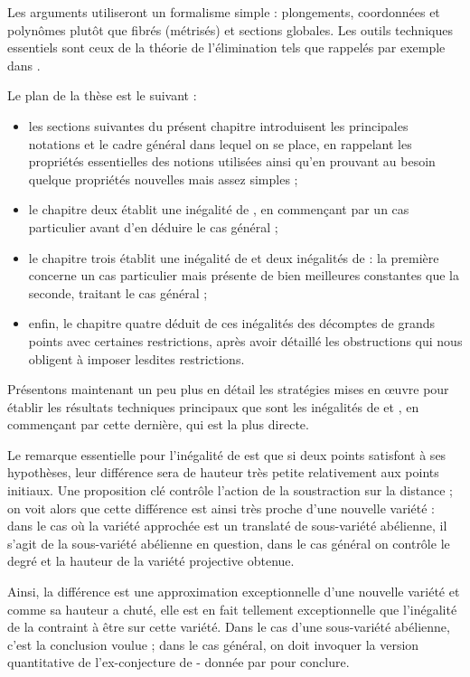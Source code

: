 Les arguments utiliseront un formalisme simple : plongements, coordonnées et
polynômes plutôt que fibrés (métrisés) et sections globales. Les outils
techniques essentiels sont ceux de la théorie de l'élimination tels que
rappelés par exemple dans \cite[chap.~5 à~7]{nesphilnm}.

Le plan de la thèse est le suivant :
\begin{itemize}
  \item les sections suivantes du présent chapitre introduisent les
    principales notations et le cadre général dans lequel on se place, en
    rappelant les propriétés essentielles des notions utilisées ainsi qu'en
    prouvant au besoin quelque propriétés nouvelles mais assez simples ;
  \item le chapitre deux établit une inégalité de , en commençant
    par un cas particulier avant d'en déduire le cas général ;
  \item le chapitre trois établit une inégalité de  et deux
    inégalités de  : la première concerne un cas particulier mais
    présente de bien meilleures constantes que la seconde, traitant le cas
    général ;
  \item enfin, le chapitre quatre déduit de ces inégalités des décomptes de
    grands points avec certaines restrictions, après avoir détaillé les
    obstructions qui nous obligent à imposer lesdites restrictions.
\end{itemize}
Présentons maintenant un peu plus en détail les stratégies mises en œuvre pour
établir les résultats techniques principaux que sont les inégalités de
 et , en commençant par cette dernière, qui est la
plus directe.

\medskip

Le remarque essentielle pour l'inégalité de  est que si deux
points satisfont à ses hypothèses, leur différence sera de hauteur très petite
relativement aux points initiaux. Une proposition clé contrôle l'action de la
soustraction sur la distance ; on voit alors que cette différence est ainsi
très proche d'une nouvelle variété : dans le cas où la variété approchée est
un translaté de sous-variété abélienne, il s'agit de la sous-variété abélienne
en question, dans le cas général on contrôle le degré et la hauteur de la
variété projective obtenue.

Ainsi, la différence est une approximation exceptionnelle d'une nouvelle
variété et comme sa hauteur a chuté, elle est en fait tellement exceptionnelle
que l'inégalité de  la contraint à être sur cette variété. Dans
le cas d'une sous-variété abélienne, c'est la conclusion voulue ; dans le cas
général, on doit invoquer la version quantitative de l'ex-conjecture de
- donnée par  pour conclure.

